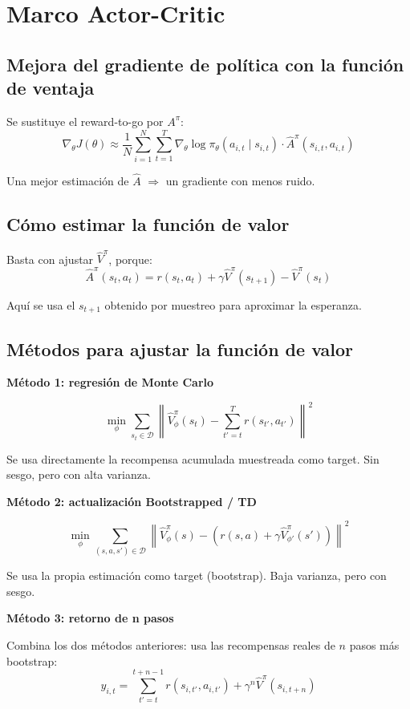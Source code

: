 \section{Marco Actor-Critic}

\subsection{Mejora del gradiente de política con la función de ventaja}

Se sustituye el reward-to-go por $A^\pi$:
$$\nabla_\theta J(\theta) \approx \frac{1}{N}\sum_{i=1}^{N}\sum_{t=1}^{T} \nabla_\theta \log \pi_\theta(a_{i,t} \mid s_{i,t}) \cdot \hat{A}^\pi(s_{i,t}, a_{i,t})$$

Una mejor estimación de $\hat{A}$ $\Rightarrow$ un gradiente con menos ruido.

\subsection{Cómo estimar la función de valor}

Basta con ajustar $\hat{V}^\pi$, porque:
$$\hat{A}^\pi(s_t, a_t) = r(s_t, a_t) + \gamma \hat{V}^\pi(s_{t+1}) - \hat{V}^\pi(s_t)$$

Aquí se usa el $s_{t+1}$ obtenido por muestreo para aproximar la esperanza.

\subsection{Métodos para ajustar la función de valor}

\textbf{Método 1: regresión de Monte Carlo}

$$\min_\phi \sum_{s_t \in \mathcal{D}} \left\| \hat{V}^\pi_\phi(s_t) - \sum_{t'=t}^{T} r(s_{t'}, a_{t'}) \right\|^2$$

Se usa directamente la recompensa acumulada muestreada como target. Sin sesgo, pero con alta varianza.

\textbf{Método 2: actualización Bootstrapped / TD}

$$\min_\phi \sum_{(s,a,s') \in \mathcal{D}} \left\| \hat{V}^\pi_\phi(s) - \left(r(s,a) + \gamma \hat{V}^\pi_{\phi'}(s')\right) \right\|^2$$

Se usa la propia estimación como target (bootstrap). Baja varianza, pero con sesgo.

\textbf{Método 3: retorno de n pasos}

Combina los dos métodos anteriores: usa las recompensas reales de $n$ pasos más bootstrap:
$$y_{i,t} = \sum_{t'=t}^{t+n-1} r(s_{i,t'}, a_{i,t'}) + \gamma^n \hat{V}^\pi(s_{i,t+n})$$

